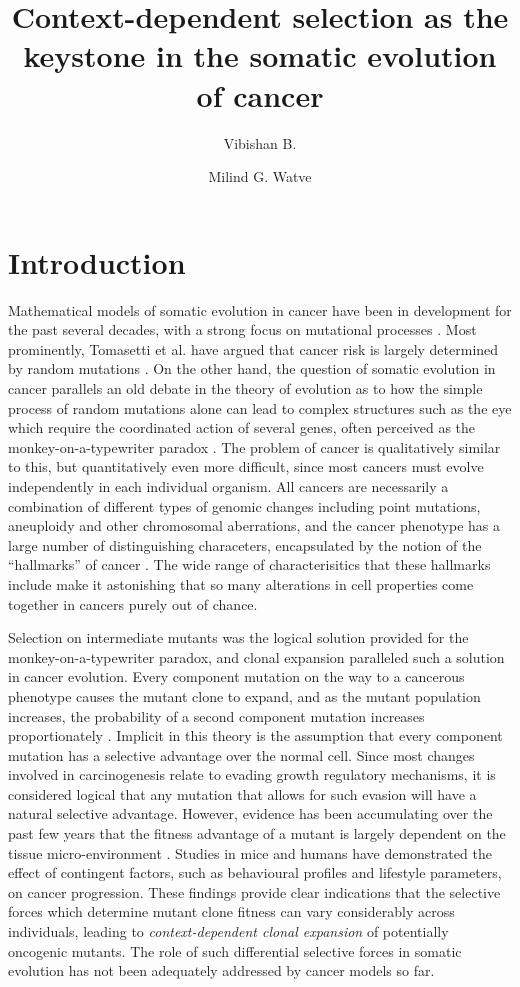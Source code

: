 \documentclass[10pt,twocolumn,twoside]{article}
\author[1]{Vibishan B.}
\author[1,*]{Milind G. Watve}
\affil[1]{Department of Biology, Indian Institute of Science Education and Research (IISER), Pune}
\affil[*]{Corresponding author: milind@iiserpune.ac.in}
\title{Context-dependent selection as the keystone in the somatic evolution of cancer}
\begin{document}
\maketitle

\section{Introduction}

Mathematical models of somatic evolution in cancer have been in development for the past several decades, with a strong focus on mutational processes \cite{ARMITAGE1954, McFarland2013, Blokzijl2016, Mina2017}. Most prominently, Tomasetti et al. have argued that cancer risk is largely determined by random mutations \cite{Tomasetti78, Tomasetti2017}. On the other hand, the question of somatic evolution in cancer parallels an old debate in the theory of evolution as to how the simple process of random mutations alone can lead to complex structures such as the eye which require the coordinated action of several genes, often perceived as the monkey-on-a-typewriter paradox \cite{Dawkins1996}. The problem of cancer is qualitatively similar to this, but quantitatively even more difficult, since most cancers must evolve independently in each individual organism. All cancers are necessarily a combination of different types of genomic changes including point mutations, aneuploidy and other chromosomal aberrations, and the cancer phenotype has a large number of distinguishing characeters, encapsulated by the notion of the ``hallmarks'' of cancer \cite{Hanahan2000, Schafer2008, Hanahan2011}. The wide range of characterisitics that these hallmarks include make it astonishing that so many alterations in cell properties come together in cancers purely out of chance.

Selection on intermediate mutants was the logical solution provided for the monkey-on-a-typewriter paradox, and clonal expansion paralleled such a solution in cancer evolution. Every component mutation on the way to a cancerous phenotype causes the mutant clone to expand, and as the mutant population increases, the probability of a second component mutation increases proportionately \cite{Nowell1976}. Implicit in this theory is the assumption that every component mutation has a selective advantage over the normal cell. Since most changes involved in carcinogenesis relate to evading growth regulatory mechanisms, it is considered logical that any mutation that allows for such evasion will have a natural selective advantage. However, evidence has been accumulating over the past few years that the fitness advantage of a mutant is largely dependent on the tissue micro-environment \cite{Hanahan2012, Pietras2010}. Studies in mice \cite{Cao2010} and humans \cite{Rundqvist2013} have demonstrated the effect of contingent factors, such as behavioural profiles and lifestyle parameters, on cancer progression. These findings provide clear indications that the selective forces which determine mutant clone fitness can vary considerably across individuals, leading to \textit{context-dependent clonal expansion} of potentially oncogenic mutants. The role of such differential selective forces in somatic evolution has not been adequately addressed by cancer models so far.
\end{document}
